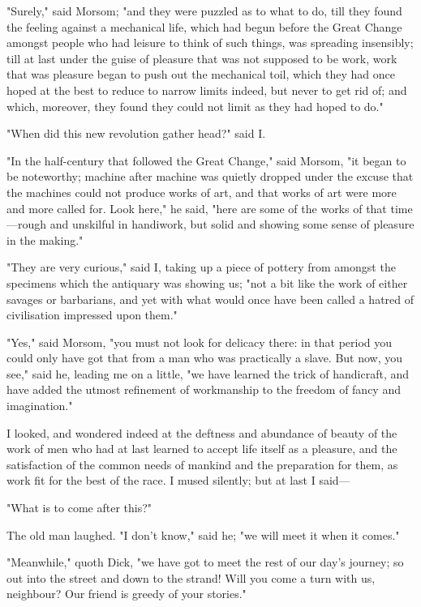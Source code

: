 "Surely," said Morsom; "and they were puzzled as to what to do, till
they found the feeling against a mechanical life, which had begun before
the Great Change amongst people who had leisure to think of such things,
was spreading insensibly; till at last under the guise of pleasure that
was not supposed to be work, work that was pleasure began to push out
the mechanical toil, which they had once hoped at the best to reduce to
narrow limits indeed, but never to get rid of; and which, moreover, they
found they could not limit as they had hoped to do."

"When did this new revolution gather head?" said I.

"In the half-century that followed the Great Change," said Morsom, "it
began to be noteworthy; machine after machine was quietly dropped under
the excuse that the machines could not produce works of art, and that
works of art were more and more called for. Look here," he said, "here
are some of the works of that time---rough and unskilful in handiwork,
but solid and showing some sense of pleasure in the making."

"They are very curious," said I, taking up a piece of pottery from
amongst the specimens which the antiquary was showing us; "not a bit
like the work of either savages or barbarians, and yet with what would
once have been called a hatred of civilisation impressed upon them."

"Yes," said Morsom, "you must not look for delicacy there: in that
period you could only have got that from a man who was practically a
slave. But now, you see," said he, leading me on a little, "we have
learned the trick of handicraft, and have added the utmost refinement of
workmanship to the freedom of fancy and imagination."

I looked, and wondered indeed at the deftness and abundance of beauty of
the work of men who had at last learned to accept life itself as a
pleasure, and the satisfaction of the common needs of mankind and the
preparation for them, as work fit for the best of the race. I mused
silently; but at last I said---

"What is to come after this?"

The old man laughed. "I don't know," said he; "we will meet it when it
comes."

"Meanwhile," quoth Dick, "we have got to meet the rest of our day's
journey; so out into the street and down to the strand! Will you come a
turn with us, neighbour? Our friend is greedy of your stories."

